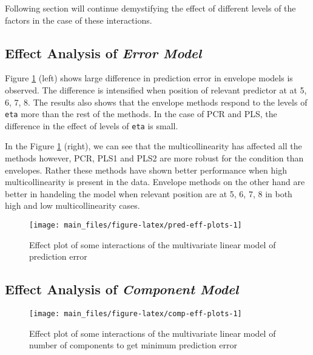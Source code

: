 \documentclass[12pt,3p,authoryear]{elsarticle}
\begin{document}
Following section will continue demystifying the effect of different
levels of the factors in the case of these interactions.

\subsection{\texorpdfstring{Effect Analysis of \emph{Error
Model}}{Effect Analysis of Error Model}}\label{effect-analysis-of-error-model}

Figure \ref{fig:pred-eff-plots} (left) shows large difference in
prediction error in envelope models is observed. The difference is
intensified when position of relevant predictor at at 5, 6, 7, 8. The
results also shows that the envelope methods respond to the levels of
\texttt{eta} more than the rest of the methods. In the case of PCR and
PLS, the difference in the effect of levels of \texttt{eta} is small.

In the Figure \ref{fig:pred-eff-plots} (right), we can see that the
multicollinearity has affected all the methods however, PCR, PLS1 and
PLS2 are more robust for the condition than envelopes. Rather these
methods have shown better performance when high multicollinearity is
present in the data. Envelope methods on the other hand are better in
handeling the model when relevant position are at 5, 6, 7, 8 in both
high and low multicollinearity cases.




\begin{figure}
\texttt{[image: main\_files/figure-latex/pred-eff-plots-1]} \caption{Effect plot of some interactions of the multivariate
linear model of prediction error}\label{fig:pred-eff-plots}
\end{figure}

\subsection{\texorpdfstring{Effect Analysis of \emph{Component
Model}}{Effect Analysis of Component Model}}\label{effect-analysis-of-component-model}




\begin{figure}
\texttt{[image: main\_files/figure-latex/comp-eff-plots-1]} \caption{Effect plot of some interactions of the multivariate
linear model of number of components to get minimum prediction error}\label{fig:comp-eff-plots}
\end{figure}
\end{document}
